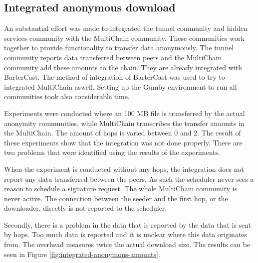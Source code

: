 \subsection{Integrated anonymous download}
An substantial effort was made to integrated the tunnel community and hidden services community with the MultiChain community.
These communities work together to provide functionality to transfer data anonymously.
The tunnel community reports data transferred between peers and the MultiChain community add these amounts to the chain.
They are already integrated with BarterCast.
The method of integration of BarterCast was used to try to integrated MultiChain aswell.
Setting up the Gumby environment to run all communities took also considerable time.

Experiments were conducted where an 100 MB file is transferred by the actual anonymity communities,
while MultiChain transcribes the transfer amounts in the MultiChain.
The amount of hops is varied between 0 and 2.
The result of these experiments show that the integration was not done properly.
There are two problems that were identified using the results of the experiments.

When the experiment is conducted without any hops,
the integration does not report any data transferred between the peers.
As such the scheduler never sees a reason to schedule a signature request.
The whole MultiChain community is never active.
The connection between the seeder and the first hop,
or the downloader, directly is not reported to the scheduler.

Secondly, there is a problem in the data that is reported by the data that is sent by hops.
Too much data is reported and it is unclear where this data originates from.
The overhead measures twice the actual download size.
The results can be seen in Figure \ref{fig:integrated-anonymous-amounts}.

